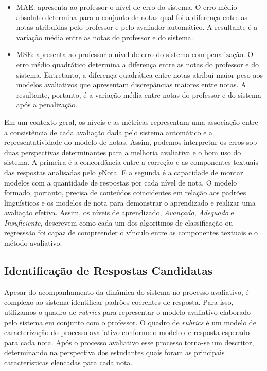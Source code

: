 \begin{minipage}[!h]{0.45\textwidth}
\begin{itemize}
	\item MAE: apresenta ao professor o nível de erro do sistema. O erro médio absoluto determina para o conjunto de notas qual foi a diferença entre as notas atribuídas pelo professor e pelo avaliador automático. A resultante é a variação média entre as notas do professor e do sistema.

	\item MSE: apresenta ao professor o nível de erro do sistema com penalização. O erro médio quadrático determina a diferença entre as notas do professor e do sistema. Entretanto, a diferença quadrática entre notas atribui maior peso aos modelos avaliativos que apresentam discrepâncias maiores entre notas. A resultante, portanto, é a variação média entre notas do professor e do sistema após a penalização.

\end{itemize}

Em um contexto geral, os níveis e as métricas representam uma associação entre a consistência de cada avaliação dada pelo sistema automático e a representatividade do modelo de notas. Assim, podemos interpretar os erros sob duas perspectivas determinantes para a melhoria avaliativa e o bom uso do sistema. A primeira é a concordância entre a correção e as componentes textuais das respostas analisadas pelo \textit{p}Nota. E a segunda é a capacidade de montar modelos com a quantidade de respostas por cada nível de nota. O modelo formado, portanto, precisa de conteúdos coincidentes em relação aos padrões linguísticos e os modelos de nota para demonstrar o aprendizado e realizar uma avaliação efetiva. Assim, os níveis de aprendizado, \textit{Avançado}, \textit{Adequado} e \textit{Insuficiente}, descrevem como cada um dos algoritmos de classificação ou regresssão foi capaz de compreender o vínculo entre as componentes textuais e o método avaliativo.

\subsection{Identificação de Respostas Candidatas}

Apesar do acompanhamento da dinâmica do sistema no processo avaliativo, é complexo ao sistema identificar padrões coerentes de resposta. Para isso, utilizamos o quadro de \textit{rubrics} para representar o modelo avaliativo elaborado pelo sistema em conjunto com o professor. O quadro de \textit{rubrics} é um modelo de caracterização do processo avaliativo conforme o modelo de resposta esperado para cada nota. Após o processo avaliativo esse processo torna-se um descritor, determinando na perspectiva dos estudantes quais foram as principais características elencadas para cada nota. 


\end{minipage}
